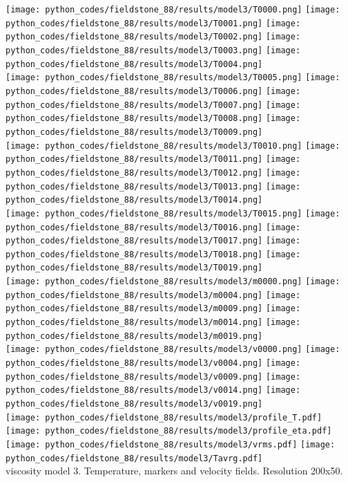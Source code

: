 \begin{center}
\texttt{[image: python\_codes/fieldstone\_88/results/model3/T0000.png]}
\texttt{[image: python\_codes/fieldstone\_88/results/model3/T0001.png]}
\texttt{[image: python\_codes/fieldstone\_88/results/model3/T0002.png]}
\texttt{[image: python\_codes/fieldstone\_88/results/model3/T0003.png]}
\texttt{[image: python\_codes/fieldstone\_88/results/model3/T0004.png]}\\
\texttt{[image: python\_codes/fieldstone\_88/results/model3/T0005.png]}
\texttt{[image: python\_codes/fieldstone\_88/results/model3/T0006.png]}
\texttt{[image: python\_codes/fieldstone\_88/results/model3/T0007.png]}
\texttt{[image: python\_codes/fieldstone\_88/results/model3/T0008.png]}
\texttt{[image: python\_codes/fieldstone\_88/results/model3/T0009.png]}\\
\texttt{[image: python\_codes/fieldstone\_88/results/model3/T0010.png]}
\texttt{[image: python\_codes/fieldstone\_88/results/model3/T0011.png]}
\texttt{[image: python\_codes/fieldstone\_88/results/model3/T0012.png]}
\texttt{[image: python\_codes/fieldstone\_88/results/model3/T0013.png]}
\texttt{[image: python\_codes/fieldstone\_88/results/model3/T0014.png]}\\
\texttt{[image: python\_codes/fieldstone\_88/results/model3/T0015.png]}
\texttt{[image: python\_codes/fieldstone\_88/results/model3/T0016.png]}
\texttt{[image: python\_codes/fieldstone\_88/results/model3/T0017.png]}
\texttt{[image: python\_codes/fieldstone\_88/results/model3/T0018.png]}
\texttt{[image: python\_codes/fieldstone\_88/results/model3/T0019.png]}\\
\texttt{[image: python\_codes/fieldstone\_88/results/model3/m0000.png]}
\texttt{[image: python\_codes/fieldstone\_88/results/model3/m0004.png]}
\texttt{[image: python\_codes/fieldstone\_88/results/model3/m0009.png]}
\texttt{[image: python\_codes/fieldstone\_88/results/model3/m0014.png]}
\texttt{[image: python\_codes/fieldstone\_88/results/model3/m0019.png]}\\
\texttt{[image: python\_codes/fieldstone\_88/results/model3/v0000.png]}
\texttt{[image: python\_codes/fieldstone\_88/results/model3/v0004.png]}
\texttt{[image: python\_codes/fieldstone\_88/results/model3/v0009.png]}
\texttt{[image: python\_codes/fieldstone\_88/results/model3/v0014.png]}
\texttt{[image: python\_codes/fieldstone\_88/results/model3/v0019.png]}\\
\texttt{[image: python\_codes/fieldstone\_88/results/model3/profile\_T.pdf]}
\texttt{[image: python\_codes/fieldstone\_88/results/model3/profile\_eta.pdf]}\\
\texttt{[image: python\_codes/fieldstone\_88/results/model3/vrms.pdf]}
\texttt{[image: python\_codes/fieldstone\_88/results/model3/Tavrg.pdf]}\\
{\captionfont viscosity model 3. Temperature, markers and velocity fields. Resolution 200x50.}
\end{center} 


